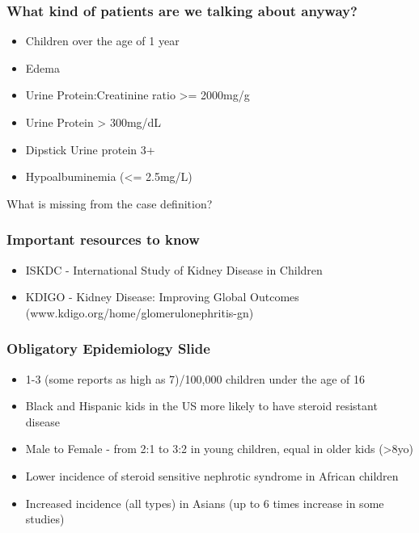 \begin{frame}\frametitle{What kind of patients are we talking about
anyway?}

\begin{itemize}[<+->]
\itemsep1pt\parskip0pt
\item
  Children over the age of 1 year
\item
  Edema
\item
  Urine Protein:Creatinine ratio \textgreater{}= 2000mg/g
\item
  Urine Protein \textgreater{} 300mg/dL
\item
  Dipstick Urine protein 3+
\item
  Hypoalbuminemia (\textless{}= 2.5mg/L)
\end{itemize}

What is missing from the case definition?

\end{frame}

\begin{frame}\frametitle{Important resources to know}

\begin{itemize}[<+->]
\itemsep1pt\parskip0pt
\item
  ISKDC - International Study of Kidney Disease in Children
\item
  KDIGO - Kidney Disease: Improving Global Outcomes
  (www.kdigo.org/home/glomerulonephritis-gn)
\end{itemize}

\end{frame}

\begin{frame}\frametitle{Obligatory Epidemiology Slide}

\begin{itemize}[<+->]
\itemsep1pt\parskip0pt
\item
  1-3 (some reports as high as 7)/100,000 children under the age of 16
\item
  Black and Hispanic kids in the US more likely to have steroid
  resistant disease
\item
  Male to Female - from 2:1 to 3:2 in young children, equal in older
  kids (\textgreater{}8yo)
\item
  Lower incidence of steroid sensitive nephrotic syndrome in African
  children
\item
  Increased incidence (all types) in Asians (up to 6 times increase in
  some studies)
\end{itemize}

\end{frame}

